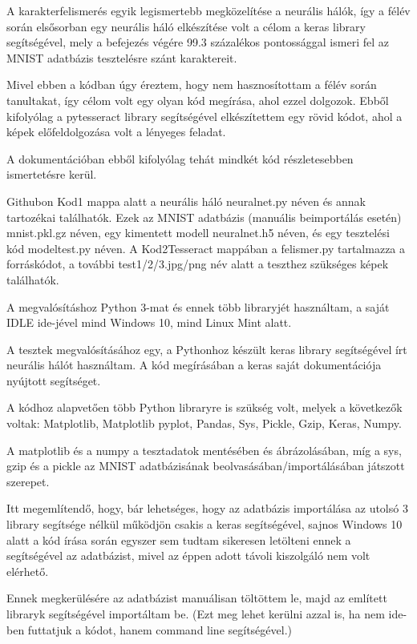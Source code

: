 \documentclass[hidelinks,12pt,a4paper]{report}
\begin{document}
A karakterfelismerés egyik legismertebb megközelítése a neurális hálók, így a félév során elsősorban egy neurális háló elkészítése volt a célom a keras library segítségével, mely a befejezés végére 99.3 százalékos pontossággal ismeri fel az MNIST adatbázis tesztelésre szánt karaktereit.

Mivel ebben a kódban úgy éreztem, hogy nem hasznosítottam a félév során tanultakat, így célom volt egy olyan kód megírása, ahol ezzel dolgozok. Ebből kifolyólag a pytesseract library segítségével elkészítettem egy rövid kódot, ahol a képek előfeldolgozása volt a lényeges feladat.

A dokumentációban ebből kifolyólag tehát mindkét kód részletesebben ismertetésre kerül.

Githubon Kod1 mappa alatt a neurális háló neuralnet.py néven és annak tartozékai találhatók. Ezek az MNIST adatbázis (manuális beimportálás esetén) mnist.pkl.gz néven, egy kimentett modell neuralnet.h5 néven, és egy tesztelési kód modeltest.py néven.
A Kod2Tesseract mappában a felismer.py tartalmazza a forráskódot, a további test1/2/3.jpg/png név alatt a teszthez szükséges képek találhatók.

A megvalósításhoz Python 3-mat és ennek több libraryjét használtam, a saját IDLE ide-jével mind Windows 10, mind Linux Mint alatt.

	

A tesztek megvalósításához egy, a Pythonhoz készült keras library segítségével írt neurális hálót használtam.
A kód megírásában a keras saját dokumentációja nyújtott segítséget.

A kódhoz alapvetően több Python libraryre is szükség volt, melyek a következők voltak:
Matplotlib, Matplotlib pyplot, Pandas, Sys, Pickle, Gzip, Keras, Numpy.

A matplotlib és a numpy a tesztadatok mentésében és ábrázolásában, míg a sys, gzip és a pickle az MNIST adatbázisának beolvasásában/importálásában játszott szerepet.

Itt megemlítendő, hogy, bár lehetséges, hogy az adatbázis importálása az utolsó 3 library segítsége nélkül működjön csakis a keras segítségével, sajnos Windows 10 alatt a kód írása során egyszer sem tudtam sikeresen letölteni ennek a segítségével az adatbázist, mivel az éppen adott távoli kiszolgáló nem volt elérhető.

Ennek megkerülésére az adatbázist manuálisan töltöttem le, majd az említett libraryk segítségével importáltam be.
(Ezt meg lehet kerülni azzal is, ha nem ide-ben futtatjuk a kódot, hanem command line segítségével.)
\end{document}
